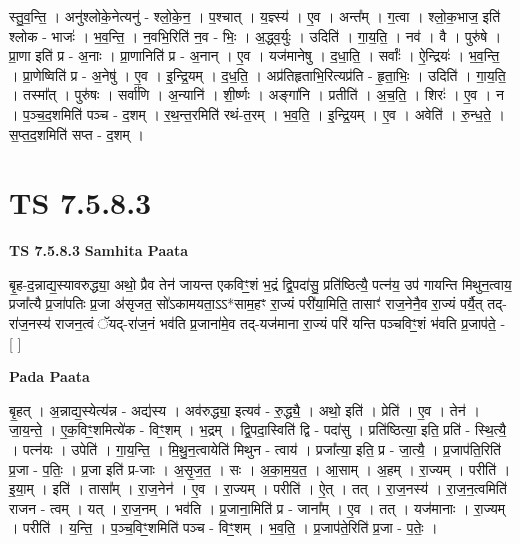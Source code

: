 \documentclass[17pt]{extarticle}
\begin{document}
स्तु॒व॒न्ति॒ । अनु॑श्लोके॒नेत्यनु॑ - श्लो॒के॒न॒ । प॒श्चात् । य॒ज्ञ्स्य॑ । ए॒व । अन्त᳚म् । ग॒त्वा । श्लो॒क॒भाज॒ इति॑ श्लोक - भाजः॑ । भ॒व॒न्ति॒ । न॒वभि॒रिति॑ न॒व - भिः॒ । अ॒द्ध्व॒र्युः । उदिति॑ । गा॒य॒ति॒ । नव॑ । वै । पुरु॑षे । प्रा॒णा इति॑ प्र - अ॒नाः । प्रा॒णानिति॑ प्र - अ॒नान् । ए॒व । यज॑मानेषु । द॒धा॒ति॒ । सर्वाः᳚ । ऐ॒न्द्रियः॑ । भ॒व॒न्ति॒ । प्रा॒णेष्विति॑ प्र - अ॒नेषु॑ । ए॒व । इ॒न्द्रि॒यम् । द॒ध॒ति॒ । अप्र॑तिहृताभि॒रित्यप्र॑ति - हृ॒ता॒भिः॒ । उदिति॑ । गा॒य॒ति॒ । तस्मा᳚त् । पुरु॑षः । सर्वा॑णि । अ॒न्यानि॑ । शी॒र्ष्णः । अङ्गा॑नि । प्रतीति॑ । अ॒च॒ति॒ । शिरः॑ । ए॒व । न । प॒ञ्च॒द॒शमिति॑ पञ्च - द॒शम् । र॒थ॒न्त॒रमिति॑ रथं-त॒रम् । भ॒व॒ति॒ । इ॒न्द्रि॒यम् । ए॒व । अवेति॑ । रु॒न्ध॒ते॒ । स॒प्त॒द॒शमिति॑ सप्त - द॒शम् ।  \newline





\section{ TS 7.5.8.3 }

\textbf{TS 7.5.8.3 } \newline
\textbf{Samhita Paata} \newline

बृ॒ह-द॒न्नाद्य॒स्यावरुद्ध्या॒ अथो॒ प्रैव तेन॑ जायन्त एकविꣳ॒॒शं भ॒द्रं द्वि॒पदा॑सु॒ प्रति॑ष्ठित्यै॒ पत्न॑य॒ उप॑ गायन्ति मिथुन॒त्वाय॒ प्रजा᳚त्यै प्र॒जा॑पतिः प्र॒जा अ॑सृजत॒ सो॑ऽकामयता॒ऽऽ*साम॒हꣳ रा॒ज्यं परी॑या॒मिति॒ तासाꣳ॑ राज॒नेनै॒व रा॒ज्यं पर्यै॒त् तद्-रा॑ज॒नस्य॑ राजन॒त्वं ॅयद्-रा॑ज॒नं भव॑ति प्र॒जाना॑मे॒व तद्-यज॑माना रा॒ज्यं परि॑ यन्ति पञ्चविꣳ॒॒शं भ॑वति प्र॒जाप॑ते॒ - [  ] \newline

\textbf{Pada Paata} \newline

बृ॒हत् । अ॒न्नाद्य॒स्येत्य॑न्न - अद्य॑स्य । अव॑रुद्ध्या॒ इत्यव॑ - रु॒द्ध्यै॒ । अथो॒ इति॑ । प्रेति॑ । ए॒व । तेन॑ । जा॒य॒न्ते॒ । ए॒क॒विꣳ॒॒शमित्ये॑क - विꣳ॒॒शम् । भ॒द्रम् । द्वि॒पदा॒स्विति॑ द्वि - पदा॑सु । प्रति॑ष्ठित्या॒ इति॒ प्रति॑ - स्थि॒त्यै॒ । पत्न॑यः । उपेति॑ । गा॒य॒न्ति॒ । मि॒थु॒न॒त्वायेति॑ मिथुन - त्वाय॑ । प्रजा᳚त्या॒ इति॒ प्र - जा॒त्यै॒ । प्र॒जाप॑ति॒रिति॑ प्र॒जा - प॒तिः॒ । प्र॒जा इति॑ प्र-जाः । अ॒सृ॒ज॒त॒ । सः । अ॒का॒म॒य॒त॒ । आ॒साम् । अ॒हम् । रा॒ज्यम् । परीति॑ । इ॒या॒म् । इति॑ । तासा᳚म् । रा॒ज॒नेन॑ । ए॒व । रा॒ज्यम् । परीति॑ । ऐ॒त् । तत् । रा॒ज॒नस्य॑ । रा॒ज॒न॒त्वमिति॑ राजन - त्वम् । यत् । रा॒ज॒नम् । भव॑ति । प्र॒जाना॒मिति॑ प्र - जाना᳚म् । ए॒व । तत् । यज॑मानाः । रा॒ज्यम् । परीति॑ । य॒न्ति॒ । प॒ञ्च॒विꣳ॒॒शमिति॑ पञ्च - विꣳ॒॒शम् । भ॒व॒ति॒ । प्र॒जाप॑ते॒रिति॑ प्र॒जा - प॒तेः॒ ।  \newline
\end{document}
